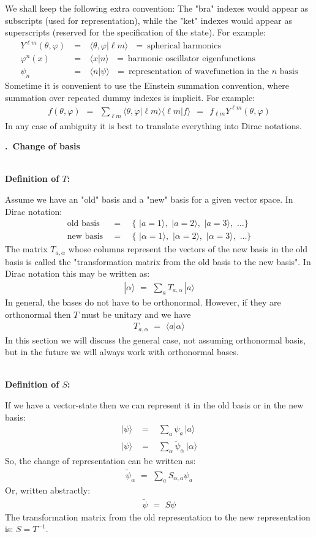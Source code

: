 \documentclass[onecolumn,fleqn, 11pt]{revtex4}
\newcommand{\beq}{\begin{eqnarray}}
\newcommand{\eeq}{\end{eqnarray}}
\renewcommand{\thesubsection}{\arabic{subsection}}
\renewcommand{\thesubsubsection}{\arabic{subsubsection}}
\newcommand{\sheadC}[1]
{
\addtocounter{subsubsection}{1}
\vspace{5mm}
{\bf \thesubsection.\thesubsubsection \ #1}  
\nopagebreak
\phantomsection
}
\begin{document}
We shall keep the following extra convention: 
The "bra" indexes would appear as subscripts (used for representation), 
while the "ket" indexes would appear as superscripts (reserved for the specification of the state). 
For example: 
\beq
Y^{\ell m}(\theta,\varphi) \ &=& \  \langle \theta,\varphi | \ell m \rangle 
\ \ \ = \ \mbox{spherical harmonics} 
\\
\varphi^n(x) \ &=& \ \langle x | n \rangle
\ \ \ = \ \mbox{harmonic oscillator eigenfunctions}
\\
\psi_n \ &=& \ \langle n | \psi \rangle
\ \ \ = \ \mbox{representation of wavefunction in the $n$ basis}  
\eeq
Sometime it is convenient to use the Einstein summation 
convention, where summation over repeated dummy indexes is implicit. 
For example:
\beq
f(\theta,\varphi) 
\ \ = \ \ 
\sum_{\ell m}       
\langle \theta,\varphi | \ell m \rangle 
\langle \ell m | f \rangle 
\ \ = \ \ 
f_{\ell m} Y^{\ell m}(\theta,\varphi) 
\eeq
In any case of ambiguity it is best 
to translate everything into Dirac notations.  



\sheadC{Change of basis} 




\ \\
{\bf Definition of $T$:} 


Assume we have an "old" basis and a "new" basis for 
a given vector space. In Dirac notation: 
\beq
\mbox{old basis}\,\,\, &=& \,\,\, \{ \,\, |a=1\rangle, \,\, |a=2\rangle, \,\, |a=3\rangle, \,\, \dots  \} 
\\ \nonumber
\mbox{new basis}\,\,\, &=& \,\,\, \{ \,\, |\alpha=1\rangle, \,\, |\alpha=2\rangle, \,\, |\alpha=3\rangle, \,\, \dots  \} 
\eeq
The matrix ${T_{a,\alpha}}$ whose columns 
represent the vectors of the new basis in 
the old basis is called 
the "transformation matrix from the old basis 
to the new basis". In Dirac notation this may be written as:
\beq
| \alpha \rangle \,\, = \,\, \sum_a T_{a,\alpha} \, | a \rangle 
\eeq
In general, the bases do not have to be orthonormal. 
However, if they are orthonormal then ${T}$ must be 
unitary and we have
\beq
T_{a,\alpha} \,\, = \,\, \langle a | \alpha \rangle 
\eeq
In this section we will discuss the general case, 
not assuming orthonormal basis, but in the future 
we will always work with orthonormal bases.


 
\ \\
{\bf Definition of $S$:} 

If we have a vector-state then we can 
represent it in the old basis or in the new basis:
\beq
| \psi \rangle \,\, 
&=& \,\, \sum_a \psi_a \, | a \rangle 
\\ \nonumber
| \psi \rangle \,\, 
&=& \,\, \sum_{\alpha} \tilde{\psi}_{\alpha} \, | \alpha \rangle 
\eeq
So, the change of representation 
can be written as: 
\beq
\tilde{\psi}_{\alpha} \,\, 
= \,\, \sum_a S_{\alpha,a} \psi_a 
\eeq
Or, written abstractly:
\beq
\tilde{\psi} \,\, 
= \,\, S \psi 
\eeq
The transformation matrix from the old representation 
to the new representation is: ${S=T^{-1}}$.
\end{document}
